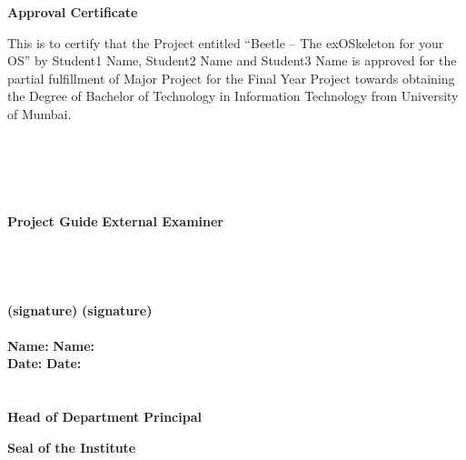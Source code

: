 \documentclass[12pt,oneside,a4paper]{article}
\begin{document}
\newpage
\thispagestyle{empty}
\vspace*{0.2cm}
\vspace{1cm}
\begin{center}
\large\textbf{Approval Certificate}
\end{center}
\vspace{2cm}
This is to certify that the Project entitled ``Beetle -- The exOSkeleton for your OS'' by Student1 Name, Student2 Name and Student3 Name is approved for the partial fulfillment of Major Project for the Final Year Project towards obtaining the Degree of Bachelor of Technology in Information Technology from University of Mumbai.\\
\\
\\
\\
\\
\\
\textbf{Project Guide} \hspace{3.5in} \textbf{External Examiner}\\
\\
\\
\\
\\
\textbf{(signature)} \hspace{3.75in} \textbf{(signature)} \\
\\
\vspace{1cm}
\textbf{Name:} \hspace{4.1in} \textbf{Name:}\\
\vspace{1cm}
\textbf{Date:} \hspace{4.2in} \textbf{Date:}\\
\vspace{1cm}
\\
\\
\textbf{Head of Department} \hspace{3in} \textbf{Principal}\\
\vspace{2cm}
\begin{center}
\textbf{Seal of the Institute}\\
\end{center}

\newpage
\end{document}
